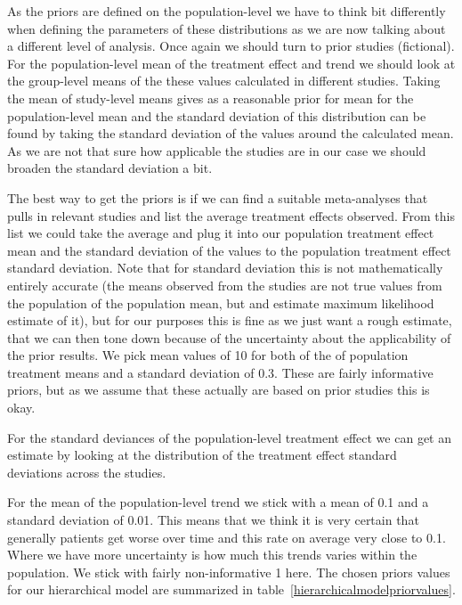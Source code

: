\documentclass[12pt,a4paper,leqno]{report}
\theoremstyle{plain}
\theoremstyle{definition}
\theoremstyle{remark}
\begin{document}

As the priors are defined on the population-level we have to think bit differently when defining the
parameters of these distributions as we are now talking about
a different level of analysis. Once again we should turn to prior studies (fictional).
For the population-level mean of the treatment effect and trend we should look at the
group-level means of the
these values calculated in different studies. Taking the mean
of study-level means gives as a reasonable prior for mean for the population-level mean and the
standard deviation of this distribution can be found by taking the standard deviation of
the values around the calculated mean. As we are not that sure how applicable the
studies are in our case we should broaden the standard deviation a bit.

The best way to get the priors is if we can find a suitable meta-analyses that
pulls in relevant studies and list the average treatment effects observed. From this list
we could take the average and plug it into our population treatment effect mean and the
standard deviation of the values to the population treatment effect standard deviation.
Note that for standard deviation this is not mathematically entirely accurate (the means
observed from the studies are not true values from the population of the population mean, but and estimate
maximum likelihood estimate of it), but for our purposes this is fine as we just want a
rough estimate, that we can then tone down because of the uncertainty about the
applicability of the prior results. We pick mean values of 10 for both of the of
population treatment means and a standard deviation of 0.3. These are fairly informative
priors, but as we assume that these actually are based on prior studies this is okay.

For the standard deviances of the population-level treatment effect we can get an
estimate by looking at the distribution of the treatment effect standard deviations
across the studies.


For the mean of the population-level trend we stick with a mean of 0.1 and a standard
deviation of 0.01. This means that we think it is very certain that generally patients
get worse over time and this rate on average very close to 0.1. Where we have more
uncertainty is how much this trends varies within the population. We stick with fairly
non-informative 1 here. The chosen priors values for our hierarchical
model are summarized in table\ \ref{hierarchicalmodelpriorvalues}.
\end{document}
